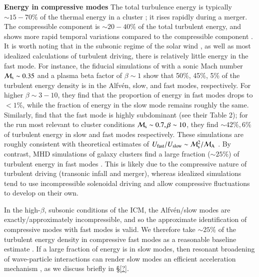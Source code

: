 \documentclass[fleqn,usenatbib,useAMS]{mnras}
\begin{document}
{\bf Energy in compressive modes} The total turbulence energy is typically $\sim 15-70\%$ of the thermal energy in a cluster \citep{vazza11}; it rises rapidly during a merger. The compressible component is $\sim 20-40\%$ of the total turbulent energy, and shows more rapid temporal variations compared to the compressible component \citep{2013ApJ...771..131B,2015ApJ...800...60M}. It is worth noting that in the subsonic regime of the solar wind \citep{yao11,howes12}, as well as most idealized calculations of turbulent driving, there is relatively little energy in the fast mode. For instance, the fiducial simulations of \citet{lynn14} with a sonic Mach number ${\mathcal M}_{\rm s} \sim 0.35$ and a plasma beta factor of $\beta \sim 1$ show that 50\%, 45\%, 5\% of the turbulent energy density is in the Alfv{\'e}n, slow, and fast modes, respectively. For higher $\beta \sim 3-10$, they find that the proportion of energy in fast modes drops to $< 1\%$, while the fraction of energy in the slow mode remains roughly the same. Similarly, \citet{kowal10} find that the fast mode is highly subdominant (see their Table 2); for the run most relevant to cluster conditions ${\mathcal M}_{\rm s} \sim 0.7, \beta \sim 10$, they find $\sim 42\%, 6\%$ of turbulent energy in slow and fast modes respectively. These simulations are roughly consistent with theoretical estimates of $U_{\rm fast}/U_{\rm slow} \sim {\mathcal M}_{\rm s}^{2}/{\mathcal M}_{\rm A}$ \citep{cho03}. By contrast, MHD simulations of galaxy clusters find a large fraction ($\sim 25$\%) of turbulent energy in fast modes \citep{2013ApJ...771..131B}. This is likely due to the compressive nature of turbulent driving (transonic infall and merger), whereas idealized simulations tend to use incompressible solenoidal driving and allow compressive fluctuations to develop on their own. 

In the high-$\beta$, subsonic conditions of the ICM, the Alfv{\'e}n/slow modes are exactly/approximately incompressible, and so the approximate identification of compressive modes with fast modes is valid. We therefore take $\sim 25\%$ of the turbulent energy density in compressive fast modes as a reasonable baseline estimate \citep{2013ApJ...771..131B,2015ApJ...800...60M}. If a large fraction of energy is in slow modes, then resonant broadening of wave-particle interactions can render slow modes an efficient acceleration mechanism \citep{lynn14}, as we discuss briefly in \S\ref{?}.
\end{document}
